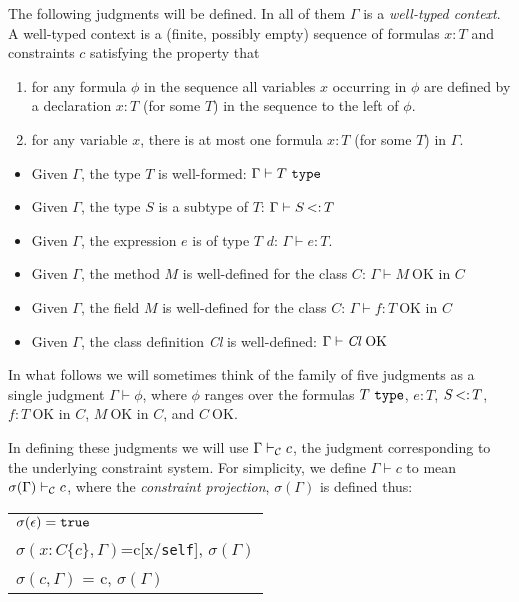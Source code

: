 \documentclass[preprint,nocopyrightspace,9pt]{sigplanconf}
\def\self{\mbox{\tt self}}
\begin{document}
The following judgments will be defined. In all of them $\Gamma$ is a
{\em well-typed context}. A well-typed context is a (finite, possibly
empty) sequence of formulas $x:T$ and constraints $c$ satisfying the
property that
\begin{enumerate}
  \item for any formula $\phi$ in the sequence all variables $x$
    occurring in $\phi$ are defined by a declaration $x:T$ (for some $T$)
    in the sequence to the left of $\phi$.
  \item for any variable $x$, there is at most one formula $x:T$ (for
  some $T$) in $\Gamma$.
\end{enumerate}


\begin{itemize}
  \item Given $\Gamma$, the type $T$ is well-formed: $\Gamma \vdash T
  \ {\tt type}$
  \item Given $\Gamma$, the type $S$ is a subtype of $T$: $\Gamma \vdash S \subtype T$
  \item Given $\Gamma$, the expression $e$ is of type $T$ 
   $d$: $\Gamma \vdash e:T$.

  \item Given $\Gamma$, the method $M$ is well-defined for the class $C$: 
  $\Gamma \vdash M\ \mbox{OK in $C$}$
  \item Given $\Gamma$, the field $M$ is well-defined for the class $C$:
    $\Gamma \vdash f:T\ \mbox{OK in $C$}$
  \item Given $\Gamma$, the class definition \mbox{\em Cl} is well-defined: $\Gamma \vdash \mbox{{\em Cl}\ OK}$
\end{itemize}


In what follows we will sometimes think of the family of five
judgments as a single judgment $\Gamma \vdash \phi$, where $\phi$
ranges over the formulas $T\ \tt type$, $e:T$, $S \subtype T$, $f:T\
\mbox{OK in $C$}$, $M\ \mbox{OK in $C$}$, and $C\ \mbox{OK}$.

In defining these judgments we will use $\Gamma \vdash_{\cal C} c$,
the judgment corresponding to the underlying constraint system. For simplicity,
we define $\Gamma \vdash c$ to mean $\sigma(\Gamma)\vdash_{\cal C} c$,
where the {\em constraint projection}, $\sigma(\Gamma)$ is defined thus:

\begin{tabular}{l}
$\sigma(\epsilon)={\tt true}$\\
$\sigma(x:C\{c\}, \Gamma)$=c[x/\self], $\sigma(\Gamma)$\\
$\sigma(c,\Gamma)$ = c, $\sigma(\Gamma)$
\end{tabular}
\end{document}
